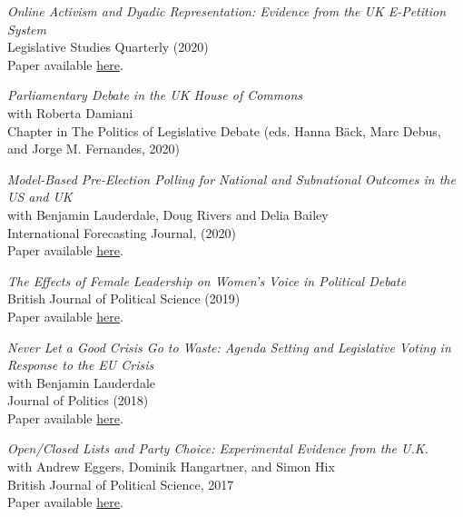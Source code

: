 \documentclass[centered]{res}
\begin{document}
\begin{resume}
{\sl Online Activism and Dyadic Representation: Evidence from the UK E-Petition System} \\
Legislative Studies Quarterly (2020) \\
Paper available \href{https://www.jackblumenau.com/papers/petitions.pdf} {here}.

{\sl Parliamentary Debate in the UK House of Commons} \\
with Roberta Damiani \\
Chapter in The Politics of Legislative Debate (eds. Hanna B{\"a}ck, Marc Debus, and Jorge M. Fernandes, 2020) 

{\sl Model-Based Pre-Election Polling for National and Subnational Outcomes in the US and UK} \\
with Benjamin Lauderdale, Doug Rivers and Delia Bailey\\ 
International Forecasting Journal, (2020)\\
Paper available \href{https://www.sciencedirect.com/science/article/abs/pii/S016920701930189X} {here}.

{\sl The Effects of Female Leadership on Women's Voice in Political Debate} \\
British Journal of Political Science (2019) \\
Paper available \href{https://www.cambridge.org/core/journals/british-journal-of-political-science/article/effects-of-female-leadership-on-womens-voice-in-political-debate/146CC7A7C2965ACBEC82BC328BD2D5F2} {here}.

{\sl Never Let a Good Crisis Go to Waste: Agenda Setting and Legislative Voting in Response to the EU Crisis} \\
with Benjamin Lauderdale\\
Journal of Politics (2018)\\
Paper available \href{https://www.journals.uchicago.edu/doi/abs/10.1086/694543} {here}.


{\sl Open/Closed Lists and Party Choice: Experimental Evidence from the U.K.}\\with Andrew Eggers, Dominik Hangartner, and Simon Hix \\
British Journal of Political Science, 2017\\
Paper available \href{http://journals.cambridge.org/action/displayFulltext?type=1&fid=10345643&jid=JPS&volumeId=-1&issueId=-1&aid=10345638} {here}.




\end{resume}
\end{document}

